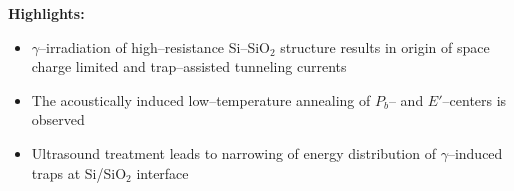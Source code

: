 \documentclass[preprint]{elsarticle}
\begin{document}
\textbf{Highlights:}

\begin{itemize}
  \item $\gamma$--irradiation of high--resistance  Si--SiO$_2$ structure results in origin of space charge limited and trap--assisted tunneling currents
  \item The acoustically induced low--temperature annealing of
      $P_b$-- and $E'$--centers is observed
  \item Ultrasound treatment leads to narrowing of energy distribution of $\gamma$--induced traps at Si/SiO$_2$  interface
\end{itemize}
\end{document}
